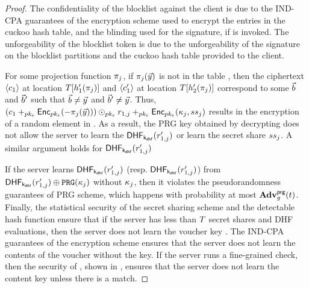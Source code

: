 \begin{proof}
The confidentiality of the blocklist against the client is due to the IND-CPA guarantees of the encryption scheme used to encrypt the entries in the cuckoo hash table, and the blinding used for the signature, if \protocolFM is invoked. The unforgeability of the blocklist token is due to the unforgeability of the signature on the blocklist partitions and the cuckoo hash table provided to the client. 

For some projection function $\projFn[\projIdx]$, if $\projFn[\projIdx](\clientVec)$ is not in the table \cuckooTable, then the ciphertext $\langle \ciphertext[1] \rangle$ at location $\cuckooTable[\cuckooHashFn{1}(\projFn[\projIdx])]$ and $\langle \ciphertext[1]' \rangle$ at location $\cuckooTable[\cuckooHashFn{2}(\projFn[\projIdx])]$ correspond to some $\blocklistVec$ and $\blocklistVec'$ such that $\blocklistVec \neq \clientVec$ and $\blocklistVec' \neq \clientVec$. Thus, $(\ciphertext[1] \homomorphicAdd{\encryptPubKey} \pkencrypt[\encryptPubKey](-\projFn[\projIdx](\clientVec))) \homomorphicScalerMult{\encryptPubKey} \genericRand[1, \projIdx] \homomorphicAdd{\encryptPubKey} \pkencrypt[\encryptPubKey](\genericSymmKey_{\projIdx}, \secretShare{\projIdx})$ results in the encryption of a random element in \group. As a result, 
the PRG key obtained by decrypting does not allow the server to learn the $\dhf[\dhfKey](\genericRandAlt[1,j])$ 
or learn the secret share $ss_{j}$. A similar argument holds for $\dhf[\dhfKey](\genericRandAlt[1,j])$

If the server learns $\dhf[\dhfKey](\genericRandAlt[1,j])$ (resp. $\dhf[\dhfKey](\genericRandAlt[1,j])$) 
from $\dhf[\dhfKey](\genericRandAlt[1,j]) \oplus \prg(\genericSymmKey_{\projIdx})$ without $\kappa_j$, then it violates the pseudorandomness guarantees of PRG scheme, which happens with probability at most $\Advantage{\prgLabel}{\genericFnFamily}(\timeBound)$. Finally, the statistical security of the secret sharing scheme and the detectable hash function ensure that if the server has less than $T$ secret shares and DHF evaluations, then the server does not learn the voucher key \voucherKey. The IND-CPA guarantees of the encryption scheme ensures that the server does not learn the contents of the voucher without the key. If the server runs a fine-grained check, then the security of \protocolFM, shown in , ensures that the server does not learn the content key unless there is a match.




\end{proof}
\fi 